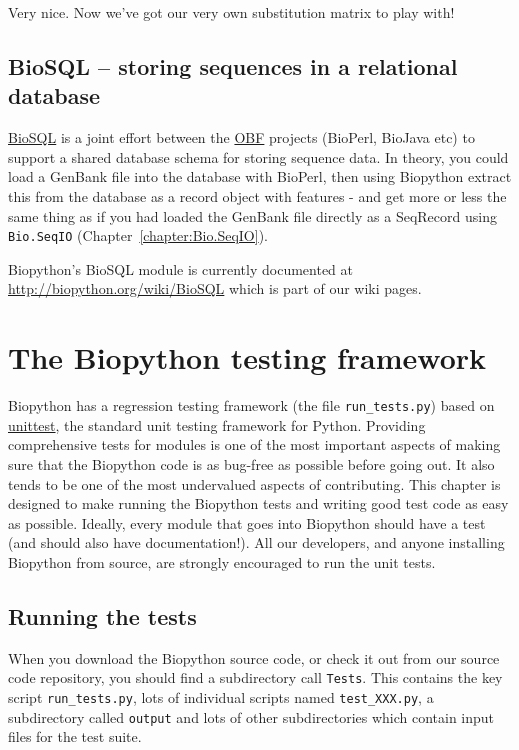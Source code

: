 \documentclass{report}
\begin{document}
Very nice. Now we've got our very own substitution matrix to play with!

\section{BioSQL -- storing sequences in a relational database}
\label{sec:BioSQL}
\href{http://www.biosql.org/}{BioSQL} is a joint effort between the
\href{http://open-bio.org/}{OBF} projects (BioPerl, BioJava etc) to support a
shared database schema for storing sequence data. In theory, you could load a
GenBank file into the database with BioPerl, then using Biopython extract this
from the database as a record object with features - and get more or less the same
thing as if you had loaded the GenBank file directly as a SeqRecord using
\verb|Bio.SeqIO| (Chapter~\ref{chapter:Bio.SeqIO}).

Biopython's BioSQL module is currently documented at
\url{http://biopython.org/wiki/BioSQL} which is part of our wiki pages.

\chapter{The Biopython testing framework}
\label{sec:regr_test}

Biopython has a regression testing framework (the file
\verb|run_tests.py|) based on
\href{http://docs.python.org/library/unittest.html}{unittest},
the standard unit testing framework for Python.  Providing comprehensive
tests for modules is one of the most important aspects of making sure that
the Biopython code is as bug-free as possible before going out.
It also tends to be one of the most undervalued aspects of contributing.
This chapter is designed to make running the Biopython tests and
writing good test code as easy as possible.
Ideally, every module that goes into Biopython
should have a test (and should also have documentation!).
All our developers, and anyone installing Biopython from source,
are strongly encouraged to run the unit tests.

\section{Running the tests}

When you download the Biopython source code, or check it out from
our source code repository, you should find a subdirectory call
\verb|Tests|.  This contains the key script \verb|run_tests.py|,
lots of individual scripts named \verb|test_XXX.py|, a subdirectory
called \verb|output| and lots of other subdirectories which
contain input files for the test suite.
\end{document}

